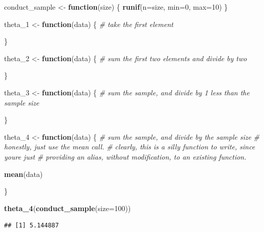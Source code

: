 \documentclass[
]{article}
\newenvironment{Shaded}{\begin{snugshade}}{\end{snugshade}}
\newcommand{\AttributeTok}[1]{\textcolor[rgb]{0.13,0.29,0.53}{#1}}
\newcommand{\CommentTok}[1]{\textcolor[rgb]{0.56,0.35,0.01}{\textit{#1}}}
\newcommand{\ControlFlowTok}[1]{\textcolor[rgb]{0.13,0.29,0.53}{\textbf{#1}}}
\newcommand{\DecValTok}[1]{\textcolor[rgb]{0.00,0.00,0.81}{#1}}
\newcommand{\FunctionTok}[1]{\textcolor[rgb]{0.13,0.29,0.53}{\textbf{#1}}}
\newcommand{\NormalTok}[1]{#1}
\newcommand{\OtherTok}[1]{\textcolor[rgb]{0.56,0.35,0.01}{#1}}
\theoremstyle{definition}
\theoremstyle{definition}
\theoremstyle{definition}
\theoremstyle{definition}
\theoremstyle{remark}
\begin{document}
\begin{Shaded}
\begin{Highlighting}[]
\NormalTok{conduct\_sample }\OtherTok{\textless{}{-}} \ControlFlowTok{function}\NormalTok{(size) \{ }
  \FunctionTok{runif}\NormalTok{(}\AttributeTok{n=}\NormalTok{size, }\AttributeTok{min=}\DecValTok{0}\NormalTok{, }\AttributeTok{max=}\DecValTok{10}\NormalTok{)}
\NormalTok{\}}
\end{Highlighting}
\end{Shaded}

\begin{Shaded}
\begin{Highlighting}[]
\NormalTok{theta\_1 }\OtherTok{\textless{}{-}} \ControlFlowTok{function}\NormalTok{(data) \{ }
  \CommentTok{\# take the first element}
  
\NormalTok{\}}

\NormalTok{theta\_2 }\OtherTok{\textless{}{-}} \ControlFlowTok{function}\NormalTok{(data) \{ }
  \CommentTok{\# sum the first two elements and divide by two}
  
\NormalTok{\}}

\NormalTok{theta\_3 }\OtherTok{\textless{}{-}} \ControlFlowTok{function}\NormalTok{(data) \{ }
  \CommentTok{\# sum the sample, and divide by 1 less than the sample size}
  
\NormalTok{\}}

\NormalTok{theta\_4 }\OtherTok{\textless{}{-}} \ControlFlowTok{function}\NormalTok{(data) \{ }
  \CommentTok{\# sum the sample, and divide by the sample size }
  \CommentTok{\# honestly, just use the mean call. }
  \CommentTok{\# clearly, this is a silly function to write, since you\textquotesingle{}re just }
  \CommentTok{\# providing an alias, without modification, to an existing function. }
  
  \FunctionTok{mean}\NormalTok{(data)}
  
\NormalTok{\}}
\end{Highlighting}
\end{Shaded}

\begin{Shaded}
\begin{Highlighting}[]
\FunctionTok{theta\_4}\NormalTok{(}\FunctionTok{conduct\_sample}\NormalTok{(}\AttributeTok{size=}\DecValTok{100}\NormalTok{))}
\end{Highlighting}
\end{Shaded}

\begin{verbatim}
## [1] 5.144887
\end{verbatim}
\end{document}
